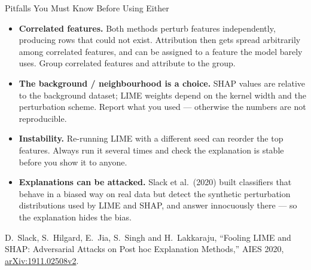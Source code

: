 \begin{frame}[allowframebreaks]{Pitfalls You Must Know Before Using Either}

    \begin{itemize}
        \setlength\itemsep{0.3em}
        \item \textbf{Correlated features.} Both methods perturb features independently, producing
              rows that could not exist. Attribution then gets spread arbitrarily among correlated
              features, and can be assigned to a feature the model barely uses. Group correlated
              features and attribute to the group.

        \item \textbf{The background / neighbourhood is a choice.} SHAP values are relative to the
              background dataset; LIME weights depend on the kernel width and the perturbation
              scheme. Report what you used --- otherwise the numbers are not reproducible.

        \item \textbf{Instability.} Re-running LIME with a different seed can reorder the top
              features. Always run it several times and check the explanation is stable before
              you show it to anyone.

        \item \textbf{Explanations can be attacked.} Slack et al.\ (2020) built classifiers that
              behave in a biased way on real data but detect the synthetic perturbation
              distributions used by LIME and SHAP, and answer innocuously there --- so the
              explanation hides the bias.
    \end{itemize}
    {\scriptsize D.~Slack, S.~Hilgard, E.~Jia, S.~Singh and H.~Lakkaraju, ``Fooling LIME and SHAP:
    Adversarial Attacks on Post hoc Explanation Methods,'' AIES 2020,
    \href{https://arxiv.org/abs/1911.02508v2}{arXiv:1911.02508v2}.}
\end{frame}

